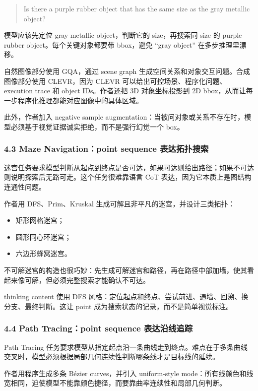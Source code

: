 \begin{quote}
Is there a purple rubber object that has the same size as the gray metallic object?
\end{quote}

模型应该先定位 gray metallic object，判断它的 size，再搜索同 size 的 purple rubber object。每个关键对象都要带 bbox，避免 ``gray object'' 在多步推理里漂移。

自然图像部分使用 GQA，通过 scene graph 生成空间关系和对象交互问题。合成图像部分使用 CLEVR，因为 CLEVR 可以给出可控场景、程序化问题、execution trace 和 object IDs。作者还把 3D 对象坐标投影到 2D bbox，从而让每一步程序化推理都能对应图像中的具体区域。

此外，作者加入 negative sample augmentation：当被问对象或关系不存在时，模型必须基于视觉证据诚实拒绝，而不是强行幻觉一个 box。

\subsubsection{4.3 Maze Navigation：point sequence 表达拓扑搜索}

迷宫任务要求模型判断从起点到终点是否可达，如果可达则给出路径；如果不可达则说明探索后无路可走。这个任务很难靠语言 CoT 表达，因为它本质上是图结构连通性问题。

作者用 DFS、Prim、Kruskal 生成可解且非平凡的迷宫，并设计三类拓扑：

\begin{itemize}[leftmargin=1.5em]
  \item 矩形网格迷宫；
  \item 圆形同心环迷宫；
  \item 六边形蜂窝迷宫。
\end{itemize}

不可解迷宫的构造也很巧妙：先生成可解迷宫和路径，再在路径中部加墙，使其看起来像可解，但必须完整搜索才能确认不可达。

thinking content 使用 DFS 风格：定位起点和终点、尝试前进、遇墙、回溯、换分支、最终判断。这让 point 成为搜索状态的记录，而不是简单视觉标注。

\subsubsection{4.4 Path Tracing：point sequence 表达沿线追踪}

Path Tracing 任务要求模型从指定起点沿一条曲线走到终点。难点在于多条曲线交叉时，模型必须根据局部几何连续性判断哪条线才是目标线的延续。

作者用程序生成多条 Bézier curves，并引入 uniform-style mode：所有线颜色和线宽相同，迫使模型不能靠颜色捷径，而要靠曲率连续性和局部几何判断。

